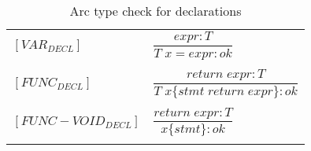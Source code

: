 \begin{table}[htbp]
    \centering
    \begin{tabular}{ll}
        $[VAR_{DECL}] $       & $\dfrac
            {expr : T}
            {T \;x = expr : ok}$
        \\
        \\
        $[FUNC_{DECL}] $      & $\dfrac
            {return \; expr : T}
            {T \;x\{stmt \;return \; expr\}  : ok}$
        \\
        \\
        $[FUNC-VOID_{DECL}] $ & $\dfrac
            {return \; expr : T}
            {x\{stmt\}  : ok}$
        \\
        \\
    \end{tabular}
    \caption{Arc type check for declarations}
    \label{tab:DeclTypeCheck}
\end{table}